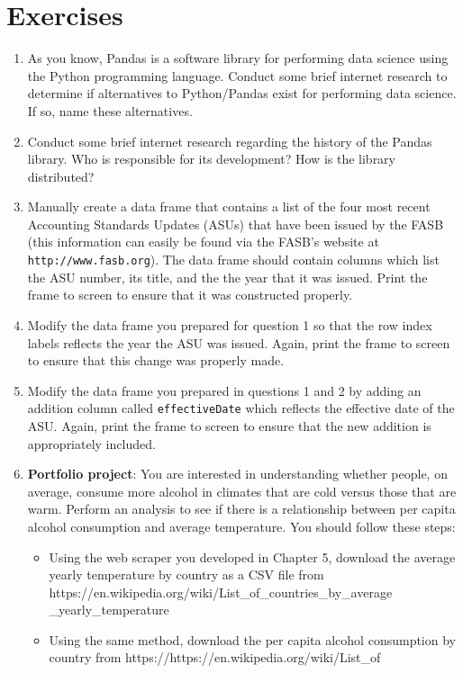\documentclass{book}
\begin{document}
\section{Exercises}
\begin{enumerate}
	\item As you know, Pandas is a software library for performing data science using the Python programming language. Conduct some brief internet research to determine if alternatives to Python/Pandas exist for performing data science. If so, name these alternatives.
	\item Conduct some brief internet research regarding the history of the Pandas library. Who is responsible for its development? How is the library distributed? 
	\item Manually create a data frame that contains a list of the four most recent Accounting Standards Updates (ASUs) that have been issued by the FASB (this information can easily be found via the FASB's website at \texttt{http://www.fasb.org}). The data frame should contain columns which list the ASU number, its title, and the the year that it was issued. Print the frame to screen to ensure that it was constructed properly.
	\item Modify the data frame you prepared for question 1 so that the row index labels reflects the year the ASU was issued. Again, print the frame to screen to ensure that this change was properly made.
	\item Modify the data frame you prepared in questions 1 and 2 by adding an addition column called \texttt{effectiveDate} which reflects the effective date of the ASU. Again, print the frame to screen to ensure that the new addition is appropriately included.
	\item \textbf{Portfolio project}:  You are interested in understanding whether people, on average, consume more alcohol in climates that are cold versus those that are warm. Perform an analysis to see if there is a relationship between per capita alcohol consumption and average temperature. You should follow these steps:
\begin{itemize}
	\item Using the web scraper you developed in Chapter 5, download the average yearly temperature by country as a CSV file from \\
	https://en.wikipedia.org/wiki/List\_of\_countries\_by\_average\\ \_yearly\_temperature
	\item Using the same method, download the per capita alcohol consumption by country from https://https://en.wikipedia.org/wiki/List\_of

\end{itemize}
\end{enumerate}
\end{document}
